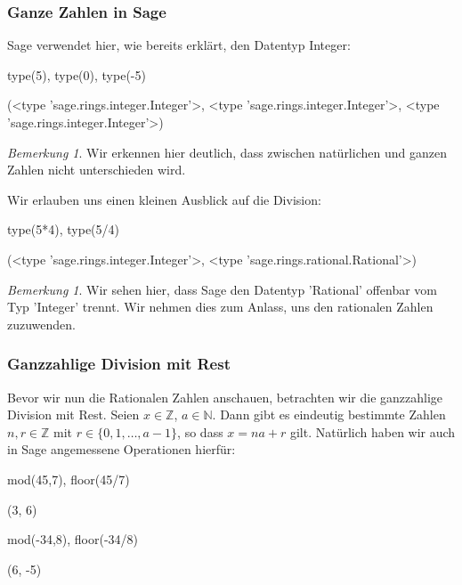 \documentclass[fontsize=12pt,paper=a4,twoside,bibtotoc,idxtotoc,
liststotoc,pagesize,BCOR1.2cm,DIV15,chapterprefix,pagesize=pdftex]{scrbook}
\theoremstyle{plain}
\theoremstyle{definition}
\theoremstyle{remark}
\newtheorem{bem}[equation]{Bemerkung}
\begin{document}
\subsubsection{Ganze Zahlen in Sage}
Sage verwendet hier, wie bereits erklärt, den Datentyp Integer:
\begin{sagein}
type(5), type(0), type(-5)
\end{sagein}
\begin{sageout}
(<type 'sage.rings.integer.Integer'>, 
<type 'sage.rings.integer.Integer'>, 
<type 'sage.rings.integer.Integer'>)
\end{sageout}
\begin{bem}
 Wir erkennen hier deutlich, dass zwischen natürlichen und ganzen Zahlen nicht unterschieden wird.
\end{bem}
Wir erlauben uns einen kleinen Ausblick auf die Division:
\begin{sagein}
type(5*4), type(5/4)
\end{sagein}
\begin{sageout}
(<type 'sage.rings.integer.Integer'>, 
<type 'sage.rings.rational.Rational'>)
\end{sageout}
\begin{bem}
 Wir sehen hier, dass Sage den Datentyp 'Rational' offenbar vom Typ 'Integer' trennt. Wir nehmen dies zum Anlass, uns den rationalen Zahlen 
zuzuwenden.
\end{bem}
\subsubsection{Ganzzahlige Division mit Rest}
Bevor wir nun die Rationalen Zahlen anschauen, betrachten wir die ganzzahlige Division mit Rest.
Seien $x \in \mathbb{Z}$, $a \in \mathbb{N}$. Dann gibt es eindeutig bestimmte Zahlen
$n,r \in \mathbb{Z}$ mit $r \in \{0,1,\dots ,a-1\}$, so dass $x=na + r$ gilt. Natürlich haben wir auch in Sage angemessene Operationen hierfür:
\begin{sagein}
mod(45,7), floor(45/7)
\end{sagein}
\begin{sageout}
(3, 6)
\end{sageout}
\begin{sagein}
mod(-34,8), floor(-34/8)
\end{sagein}
\begin{sageout}
(6, -5)
\end{sageout}
\end{document}
